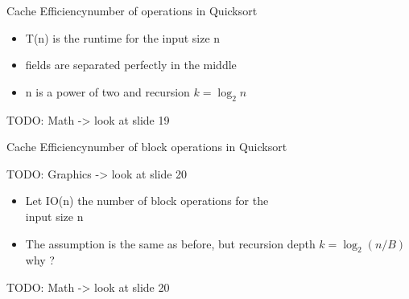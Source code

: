 
\begin{frame}{Cache Efficiency}{number of operations in Quicksort}
	\begin{itemize}
		\item
			T(n) is the runtime for the input size n
		\item
			fields are separated perfectly in the middle
		\item
			n is a power of two and recursion $k = \log_2 n$
	\end{itemize}
	
	TODO: Math -> look at slide 19 \vspace{2em}
	
\end{frame}


\begin{frame}{Cache Efficiency}{number of block operations in Quicksort}

TODO: Graphics -> look at slide 20 \vspace{2em}

	\begin{itemize}
		\item
			Let IO(n) the number of block operations for the\\
			input size n
		\item
			The assumption is the same as before, but recursion depth $k = \log_2 
			(n/B)$ why ?
	\end{itemize}
	
	TODO: Math -> look at slide 20 \vspace{2em}
	
\end{frame}